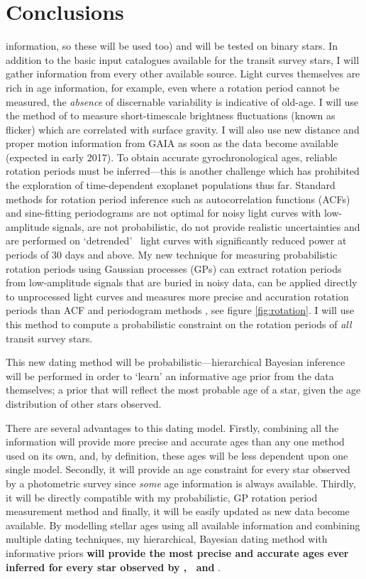 \chapter{Conclusions}

information, so these will be used too) and will be tested on binary stars.
In addition to the basic input catalogues available for the transit survey
stars, I will gather information from every other available source.
Light curves themselves are rich in age information, for example, even where
a rotation period cannot be measured, the {\it absence} of discernable
variability is indicative of old-age.
I will use the method of \citet{bastien} to measure short-timescale brightness
fluctuations (known as flicker) which are correlated with surface gravity.
I will also use new distance and proper motion information from GAIA as soon as
the data become available (expected in early 2017).
To obtain accurate gyrochronological ages, reliable rotation periods must be
inferred---this is another challenge which has prohibited the exploration of
time-dependent exoplanet populations thus far.
Standard methods for rotation period inference such as autocorrelation
functions (ACFs) and sine-fitting periodograms are not optimal for noisy light
curves with low-amplitude signals, are not probabilistic, do not provide
realistic uncertainties and are performed on `detrended' \Kepler\ light curves
with significantly reduced power at periods of 30 days and above.
My new technique for measuring probabilistic rotation periods using Gaussian
processes (GPs) can extract rotation periods from low-amplitude signals that
are buried in noisy data, can be applied directly to unprocessed light curves
and measures more precise and accuration rotation periods than ACF and
periodogram methods \citep{AngusIAU}, see figure \ref{fig:rotation}.
I will use this method to compute a probabilistic constraint on the rotation
periods of {\it all} transit survey stars.

This new dating method will be probabilistic---hierarchical Bayesian inference
will be performed in order to `learn' an informative age prior from the data
themselves; a prior that will reflect the most probable age of a star, given
the age distribution of other stars observed.

There are several advantages to this dating model.
Firstly, combining all the information will provide more precise and accurate
ages than any one method used on its own, and, by definition, these ages will
be less dependent upon one single model.
Secondly, it will provide an age constraint for every star observed by
a photometric survey since {\it some} age information is always available.
Thirdly, it will be directly compatible with my probabilistic, GP rotation
period measurement method and finally, it will be easily updated as new data
become available.
By modelling stellar ages using all available information and combining
multiple dating techniques, my hierarchical, Bayesian dating method with
informative priors {\bf will provide the most precise and accurate ages ever
inferred for every star observed by \Kepler, \Ktwo\ and \TESS}.

